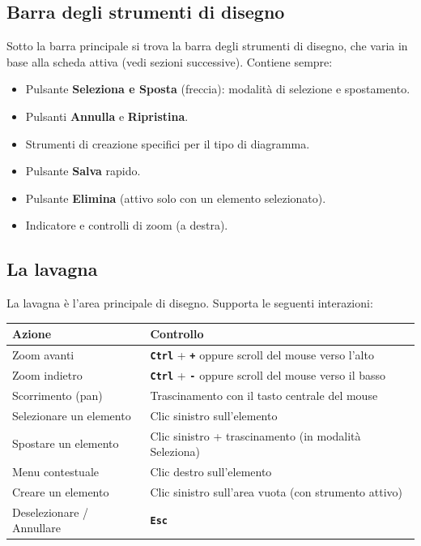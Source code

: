 \documentclass[a4paper,11pt]{article}
\newcommand{\key}[1]{\texttt{\textbf{#1}}}
\newcommand{\uielement}[1]{\textbf{#1}}
\begin{document}
\subsection{Barra degli strumenti di disegno}

Sotto la barra principale si trova la barra degli strumenti di disegno, che varia in base alla
scheda attiva (vedi sezioni successive). Contiene sempre:

\begin{itemize}
  \item Pulsante \uielement{Seleziona e Sposta} (freccia): modalità di selezione e spostamento.
  \item Pulsanti \uielement{Annulla} e \uielement{Ripristina}.
  \item Strumenti di creazione specifici per il tipo di diagramma.
  \item Pulsante \uielement{Salva} rapido.
  \item Pulsante \uielement{Elimina} (attivo solo con un elemento selezionato).
  \item Indicatore e controlli di zoom (a destra).
\end{itemize}

\subsection{La lavagna}

La lavagna è l'area principale di disegno. Supporta le seguenti interazioni:

\begin{center}
\begin{tabular}{@{}ll@{}}
  \toprule
  \textbf{Azione} & \textbf{Controllo} \\
  \midrule
  Zoom avanti & \key{Ctrl} + \key{+} oppure scroll del mouse verso l'alto \\
  Zoom indietro & \key{Ctrl} + \key{-} oppure scroll del mouse verso il basso \\
  Scorrimento (pan) & Trascinamento con il tasto centrale del mouse \\
  Selezionare un elemento & Clic sinistro sull'elemento \\
  Spostare un elemento & Clic sinistro + trascinamento (in modalità Seleziona) \\
  Menu contestuale & Clic destro sull'elemento \\
  Creare un elemento & Clic sinistro sull'area vuota (con strumento attivo) \\
  Deselezionare / Annullare & \key{Esc} \\
  \bottomrule
\end{tabular}
\end{center}
\end{document}
